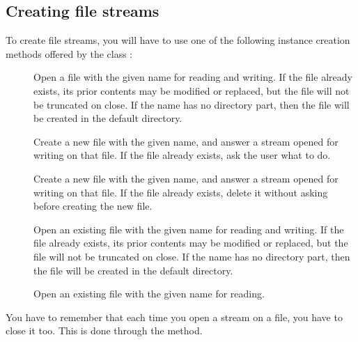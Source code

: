 \documentclass[a4paper,10pt,twoside]{book}
\begin{document}
{%
\subsection{Creating file streams}

To create file streams, you will have to use one of the following
instance creation methods offered by the class :

\begin{description}

\item[] Open a file with the given name for reading and
  writing. If the file already exists, its prior contents may be
  modified or replaced, but the file will not be truncated on
  close. If the name has no directory part, then the file will be
  created in the default directory.
  
\item[] Create a new file with the given name,
  and answer a stream opened for writing on that file. If the file
  already exists, ask the user what to do.
  
\item[] Create a new file with the given
  name, and answer a stream opened for writing on that file. If the
  file already exists, delete it without asking before creating the
  new file.

\item[] Open an existing file with the given
  name for reading and writing. If the file already exists, its prior
  contents may be modified or replaced, but the file will not be
  truncated on close. If the name has no directory part, then the file
  will be created in the default directory.

\item[] Open an existing file with the
  given name for reading.

\end{description}

You have to remember that each time you open a stream on a file, you
have to close it too. This is done through the  method.

}
\end{document}
